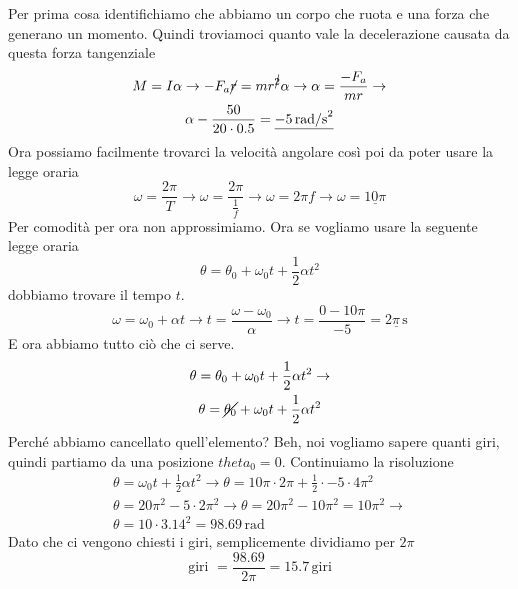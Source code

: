 Per prima cosa identifichiamo che abbiamo un corpo che ruota e una forza che generano un momento. 
Quindi troviamoci quanto vale la decelerazione causata da questa forza tangenziale
\begin{gather*}
  M = I\alpha \rightarrow -F_a\cancel{r} = mr^{\cancel{2}}\alpha \rightarrow
  \alpha = \frac{-F_a}{mr} \rightarrow \\\alpha -\frac{50}{20\cdot0.5} = \underline{-5\,\text{rad/s}^2}
\end{gather*}
Ora possiamo facilmente trovarci la velocità angolare così poi da poter usare la legge oraria
\begin{equation*}
  \omega = \frac{2\pi}{T} \rightarrow \omega = \frac{2\pi}{\frac{1}{f}} \rightarrow \omega = 2\pi f
  \rightarrow \omega = \underline{10\pi}
\end{equation*}
Per comodità per ora non approssimiamo. Ora se vogliamo usare la seguente legge oraria
\begin{equation*}
  \theta = \theta_0+\omega_0t+\frac{1}{2}\alpha t^2
\end{equation*}
dobbiamo trovare il tempo $t$.
\begin{equation*}
  \omega = \omega_0 + \alpha t \rightarrow t = \frac{\omega-\omega_0}{\alpha} \rightarrow
  t = \frac{0 - 10\pi}{-5} = \underline{2\pi\,\text{s}}
\end{equation*}
E ora abbiamo tutto ciò che ci serve.
\begin{gather*}
  \theta = \theta_0+\omega_0t+\frac{1}{2}\alpha t^2 \rightarrow\\
  \theta = \cancel{\theta_0}+\omega_0t+\frac{1}{2}\alpha t^2
\end{gather*}
Perché abbiamo cancellato quell'elemento? Beh, noi vogliamo sapere quanti giri, quindi partiamo da
una posizione $theta_0 = 0$. Continuiamo la risoluzione
\begin{gather*}
  \theta = \omega_0t+\frac{1}{2}\alpha t^2 \rightarrow
  \theta = 10\pi\cdot2\pi + \frac{1}{2}\cdot-5\cdot4\pi^2\\
  \theta = 20\pi^2 - 5\cdot2\pi^2 \rightarrow \theta = 20\pi^2-10\pi^2 = 10\pi^2 \rightarrow \\
  \theta = 10\cdot3.14^2 = \boxed{98.69\,\text{rad}}
\end{gather*}
Dato che ci vengono chiesti i giri, semplicemente dividiamo per $2\pi$
\begin{equation*}
  \text{giri } = \frac{98.69}{2\pi} = \boxed{15.7\,\text{giri}}
\end{equation*}

